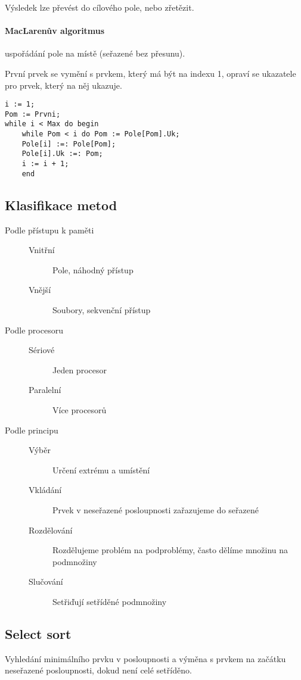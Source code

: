 \documentclass[a4paper, 11pt]{report}
\begin{document}
Výsledek lze převést do cílového pole, nebo zřetězit.

\paragraph{MacLarenův algoritmus}
uspořádání pole na místě (seřazené bez přesunu).

První prvek se vymění s prvkem, který má být na indexu 1, opraví se ukazatele pro prvek, který na něj ukazuje.

\begin{lstlisting}
i := 1;
Pom := Prvni;
while i < Max do begin
	while Pom < i do Pom := Pole[Pom].Uk;
	Pole[i] :=: Pole[Pom];
	Pole[i].Uk :=: Pom;
	i := i + 1;
	end
\end{lstlisting}

\subsection{Klasifikace metod}
\begin{description}
	\item[Podle přístupu k paměti] \hfill
	\begin{description}
		\item[Vnitřní] Pole, náhodný přístup
		\item[Vnější] Soubory, sekvenční přístup
	\end{description}
	\item[Podle procesoru] \hfill
	\begin{description}
		\item[Sériové] Jeden procesor
		\item[Paralelní] Více procesorů
	\end{description}
	\item[Podle principu] \hfill
	\begin{description}
		\item[Výběr] Určení extrému a umístění
		\item[Vkládání] Prvek v neseřazené posloupnosti zařazujeme do seřazené
		\item[Rozdělování] Rozdělujeme problém na podproblémy, často dělíme množinu na podmnožiny
		\item[Slučování] Setřiďují setříděné podmnožiny
	\end{description}
\end{description}

\subsection{Select sort}
Vyhledání minimálního prvku v posloupnosti a výměna s prvkem na začátku neseřazené posloupnosti, dokud není celé setříděno.
\end{document}
